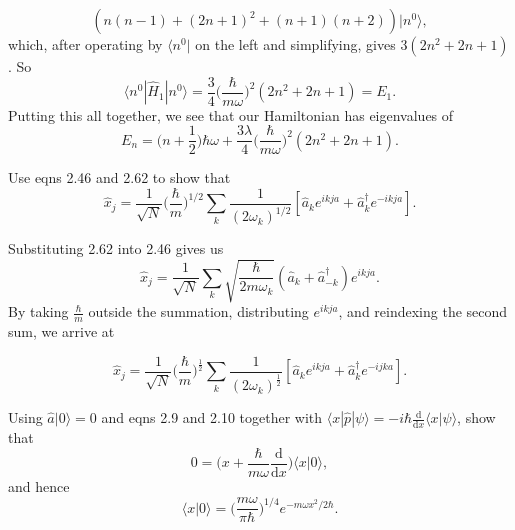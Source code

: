 \documentclass[../qft-for-the-gifted-amateur.tex]{subfiles}
\begin{document}
\begin{questions}
\begin{solution}
		\[
		(n(n - 1) + (2n + 1)^{2} + (n + 1)(n + 2))|n^{0}\rangle,
		\]
		which, after operating by $\langle n^{0}|$ on the left and
		simplifying, gives $3(2n^{2} + 2n + 1)$. So
		\[
		\langle n^{0}|{\hat{H}}_{1}|n^{0}\rangle = \frac{3}{4}\Big(\frac{\hbar}{m\omega}\Big)^{2}(2n^{2} + 2n + 1) = E_{1}.
		\]
		Putting this all together, we see that our Hamiltonian has eigenvalues
		of
		\[
		E_{n} = \Big(n + \frac{1}{2}\Big)\hbar\omega + \frac{3\lambda}{4}\Big(\frac{\hbar}{m\omega}\Big)^{2}(2n^{2} + 2n + 1).
		\]
	\end{solution}
	
	\question Use eqns 2.46 and 2.62 to show that
	\[
		\hat{x}_j = \frac{1}{\sqrt{N}}\Big(\frac{\hbar}{m}\Big)^{1/2}\sum_k\frac{1}{(2\omega_k)^{1/2}}[\hat{a}_ke^{ikja} + \hat{a}_k^\dagger{e^{-ikja}}].
	\]
	
	\begin{solution}
		Substituting 2.62 into 2.46 gives us
		\[
			{\hat{x}}_{j} = \frac{1}{\sqrt{N}}\sum_{k}\sqrt{\frac{\hbar}{2m\omega_{k}}}({\hat{a}}_{k} + {\hat{a}}_{- k}^{\dagger})e^{ikja}.
		\]
		By taking $\frac{\hbar}{m}$ outside the summation, distributing
		$e^{ikja}$, and reindexing the second sum, we arrive at
		
		\[
		{\hat{x}}_{j} = \frac{1}{\sqrt{N}}\Big(\frac{\hbar}{m}\Big)^{\frac{1}{2}}\sum_{k}\frac{1}{(2\omega_{k})^{\frac{1}{2}}}[{\hat{a}}_{k}e^{ikja} + {\hat{a}}_{k}^{\dagger}e^{- ijka}].
		\]
	\end{solution}
	
	\question Using $\hat{a}|0\rangle=0$ and eqns 2.9 and 2.10 together with $\langle{x}|\hat{p}|\psi\rangle=-i\hbar\frac{\mathrm{d}}{\mathrm{d}x}\langle{x}|\psi\rangle$, show that
	\[
		0 = \Big(x + \frac{\hbar}{m\omega}\frac{\mathrm{d}}{\mathrm{d}x}\Big)\langle{x}|0\rangle,
	\]
	and hence
	\[
		\langle{x}|0\rangle = \Big(\frac{m\omega}{\pi\hbar}\Big)^{1/4}e^{-m\omega{x}^2/2\hbar}.
	\]
	

\end{questions}
\end{document}
